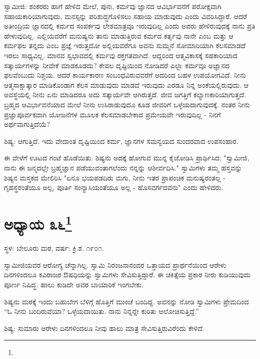 ಸ್ವಾಮೀಜಿ: ಶಂಕರರು ಹಾಗೆ ಹೇಳಿದ ಮೇಲೆ, ಪುನಃ, ಕರ್ಮವು ಜ್ಞಾನದ ಆವಿರ್ಭಾವನೆಗೆ ಪರೋಕ್ಷವಾಗಿ ಸಹಾಯಕಾರಿಯಾಗುವುದು, ಮನಸ್ಸನ್ನು ಪರಿಶುದ್ಧಗೊಳಿಸಲು ಸಹಾಯ ಮಾಡುವುದು ಎಂದು ವಿವರಿಸಿದ್ದಾರೆ. ಆದರೆ ಅತೀಂದ್ರಿಯ ಜ್ಞಾನದಲ್ಲಿ ಕರ್ಮದ ಸಂಪರ್ಕವು ಲೇಶಮಾತ್ರವೂ ಇರುವುದಿಲ್ಲ ಎಂದು ಅವರು ಹೇಳಿರುವುದಕ್ಕೆ ನಾನು ಪ್ರತಿ ಹೇಳುವುದಿಲ್ಲ. ಎಲ್ಲಿಯವರೆಗೆ ಮನುಷ್ಯನು ತಾನು ಮಾಡುತ್ತಿರುವ ಕರ್ಮದ ಕರ್ತೃವು ನಾನೇ ಎಂಬ ಮತ್ತು ಆ ಕರ್ಮಫಲ ತನ್ನದು ಎಂಬ ಪ್ರಜ್ಞೆ ಇರುತ್ತದೋ ಅಲ್ಲಿಯವರೆಗೂ ಅವನು ಸುಮ್ಮನೆ ಸೋಮಾರಿಯಾಗಿ ಕೆಲಸಮಾಡದೆ ಇರಲು ಸಾಧ್ಯವಿಲ್ಲ. ಮಾನವ ಸ್ವಭಾವದಲ್ಲಿ ಕರ್ಮವು ರಕ್ತಗತವಾಗಿದೆ. ಆದ್ದರಿಂದ ಆತ್ಮವಿಕಾಸಕ್ಕೆ ಸಹಕಾರಿಯಾದ ಸತ್ಕಾರ್ಯಗಳನ್ನು ನೀವೇಕೆ ಮಾಡಕೂಡದು? ಕೇವಲ ದೃಷ್ಟಿಯಿಂದ ನೋಡಿದರೆ ಎಲ್ಲಾ ಕರ್ಮವೂ ಅಜ್ಞಾನದ ಫಲವೆಂಬುದು ನಿಶ್ಚಯ. ಆದರೆ ಕಾರ್ಯಕಾರಣ ಸಂಬಂಧವಿರುವವರೆಗೆ ಅದರಿಂದ ಬಹಳ ಉಪಯೋಗವಿದೆ. ನೀನು ಆತ್ಮಸಾಕ್ಷಾತ್ಕಾರ ಮಾಡಿಕೊಂಡಾಗ ಕೆಲಸ ಮಾಡುವುದು ಮಾಡದೆ ಇರುವುದು ಎರಡೂ ನಿನ್ನ ಅಂಕೆಯಲ್ಲಿರುವುದು. ಆ ಅವಸ್ಥೆಯಲ್ಲಿ ನೀನು ಏನು ಮಾಡಿದರೂ ಅದು ಸತ್ಕಾರ್ಯವೇ ಆಗಿರುತ್ತದೆ. ಜೀವ ಜಗತ್ತಿಗೆ ಕಲ್ಯಾಣಕಾರಿಯಾಗುತ್ತದೆ. ಬ್ರಹ್ಮದ ಆವಿರ್ಭಾವನೆಯಾದ ಮೇಲೆ ನೀನು ಉಸಿರಾಡುವುದೂ ಕೂಡ ಜೀವರಿಗೆ ಒಳ್ಳೆಯದಾಗುವುದಕ್ಕೆ. ನಂತರ ನೀನು ಪ್ರಜ್ಞಾಪೂರ್ವಕವಾಗಿ ಯೋಜನೆಗಳ ಮೂಲಕ ಕೆಲಸಮಾಡಬೇಕಾದ ಪ್ರಮೇಯವೇ ಇರುವುದಿಲ್ಲ - ನಿನಗೆ ಅರ್ಥವಾಗುತ್ತಿದೆಯೆ?

ಶಿಷ್ಯ: ಆಗುತ್ತಿದೆ. ಇದು ವೇದಾಂತ ದೃಷ್ಟಿಯಿಂದ ಕರ್ಮ, ಜ್ಞಾನಗಳ ಸಮನ್ವಯದ ಸುಂದರವಾದ ಉಪಸಂಹಾರ.

ಈ ವೇಳೆಗೆ ಊಟದ ಗಂಟೆ ಹೊಡೆಯಿತು. ಶಿಷ್ಯನು ಅದಕ್ಕೆ ಹೋಗುವ ಮುನ್ನ ಕೈಜೋಡಿಸಿ ಪ್ರಾರ್ಥಿಸಿದ: "ಸ್ವಾಮೀಜಿ, ನಾನು ಈ ಜನ್ಮದಲ್ಲೇ ಬ್ರಹ್ಮಜ್ಞಾನ ಪಡೆಯುವಂತಾಗಲೆಂದು ನನ್ನನ್ನು ಆಶೀರ್ವದಿಸಿ." ಸ್ವಾಮಿಗಳು ತಮ್ಮ ಹಸ್ತವನ್ನು ಶಿಷ್ಯನ ಮಸ್ತಕದ ಮೇಲಿರಿಸಿ "ಏನೂ ಭಯಪಡದಿರು ಮಗು, ನೀನು ಇತರ ಪ್ರಾಪಂಚಿಕ ಮನುಷ್ಯರಂತಲ್ಲ - ಗೃಹಸ್ಥರಂತೆಯೂ ಅಲ್ಲ, ಪೂರ್ತಿ ಸಂನ್ಯಾಸಿಯಂತೆಯೂ ಅಲ್ಲ - ಹೊಸವರ್ಗದವನು" ಎಂದು ಹೇಳಿದರು.

\newpage

\chapter[ಅಧ್ಯಾಯ ೩೬]{ಅಧ್ಯಾಯ ೩೬\protect\footnote{}}

\begin{center}
ಸ್ಥಳ: ಬೇಲೂರು ಮಠ, ವರ್ಷ: ಕ್ರಿ.ಶ. ೧೯೦೧.
\end{center}

ಸ್ವಾಮೀಜಿಯವರ ಆರೋಗ್ಯ ಚೆನ್ನಾಗಿಲ್ಲ. ಸ್ವಾಮಿ ನಿರಂಜನಾನಂದರ ಒತ್ತಾಯದ ಪ್ರಾರ್ಥನೆಯಿಂದ ಆರೇಳು ದಿನಗಳಿಂದಲೂ ಕವಿರಾಜರ ಔಷಧಿಯನ್ನು ಸ್ವಾಮಿಗಳು ಸೇವಿಸುತ್ತಿದ್ದಾರೆ. ಈ ಚಿಕಿತ್ಸೆಯ ಪ್ರಕಾರ ನೀರು ಕುಡಿಯುವುದು ಪೂರ್ಣ ನಿಷಿದ್ಧ. ಹಾಲು ಕುಡಿದೇ ಅವರ ಬಾಯಾರಿಕೆ ಇಂಗಬೇಕು.

ಶಿಷ್ಯನು ಮಠಕ್ಕೆ ಇಂದು ಬಹುಬೇಗ ಬೆಳಿಗ್ಗೆ ಹೊತ್ತಿಗೆ ಮುಂಚೆ ಬಂದಿದ್ದ. ಅವನನ್ನು ನೋಡಿ ಸ್ವಾಮಿಗಳು ಪ್ರೇಮದಿಂದ “ಓ ನೀನು ಬಂದಿರುವೆಯಾ? ಒಳ್ಳೆಯದಾಯಿತು. ನಾನು ನಿನ್ನನ್ನೇ ಕುರಿತು ಆಲೋಚಿಸುತ್ತಿದ್ದೆ.”

ಶಿಷ್ಯ: ಸುಮಾರು ಆರೇಳು ದಿನಗಳಿಂದಲೂ ನೀವು ಹಾಲು ಮಾತ್ರ ಸೇವಿಸುತ್ತಿರುವಿರೆಂದು ಕೇಳಿದೆ.

